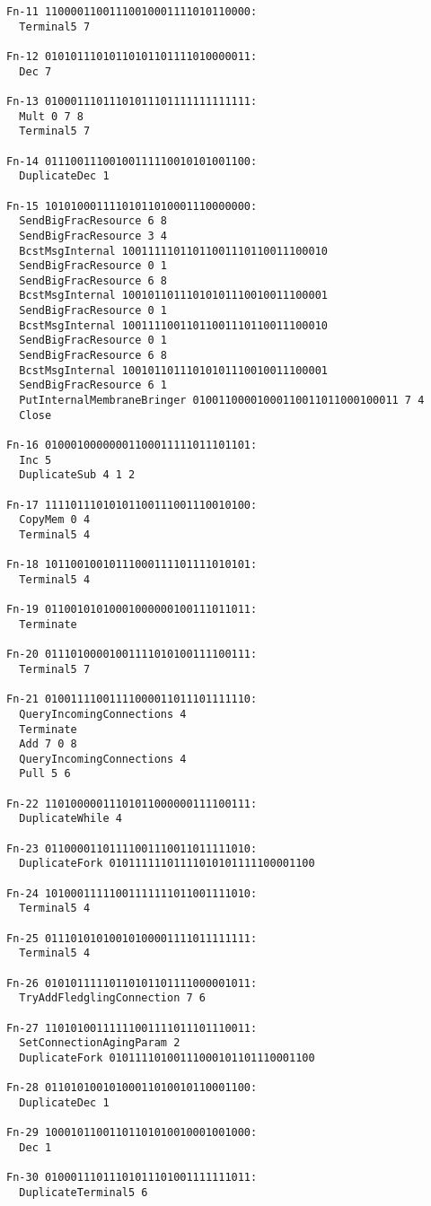 \begin{verbatim}
Fn-11 11000011001110010001111010110000:
  Terminal5 7

Fn-12 01010111010110101101111010000011:
  Dec 7

Fn-13 01000111011101011101111111111111:
  Mult 0 7 8
  Terminal5 7

Fn-14 01110011100100111110010101001100:
  DuplicateDec 1

Fn-15 10101000111101011010001110000000:
  SendBigFracResource 6 8
  SendBigFracResource 3 4
  BcstMsgInternal 10011111011011001110110011100010
  SendBigFracResource 0 1
  SendBigFracResource 6 8
  BcstMsgInternal 10010110111010101110010011100001
  SendBigFracResource 0 1
  BcstMsgInternal 10011110011011001110110011100010
  SendBigFracResource 0 1
  SendBigFracResource 6 8
  BcstMsgInternal 10010110111010101110010011100001
  SendBigFracResource 6 1
  PutInternalMembraneBringer 01001100001000110011011000100011 7 4
  Close

Fn-16 01000100000001100011111011101101:
  Inc 5
  DuplicateSub 4 1 2

Fn-17 11110111010101100111001110010100:
  CopyMem 0 4
  Terminal5 4

Fn-18 10110010010111000111101111010101:
  Terminal5 4

Fn-19 01100101010001000000100111011011:
  Terminate

Fn-20 01110100001001111010100111100111:
  Terminal5 7

Fn-21 01001111001111000011011101111110:
  QueryIncomingConnections 4
  Terminate
  Add 7 0 8
  QueryIncomingConnections 4
  Pull 5 6

Fn-22 11010000011101011000000111100111:
  DuplicateWhile 4

Fn-23 01100001101111001110011011111010:
  DuplicateFork 01011111101111010101111100001100

Fn-24 10100011111001111111011001111010:
  Terminal5 4

Fn-25 01110101010010100001111011111111:
  Terminal5 4

Fn-26 01010111110110101101111000001011:
  TryAddFledglingConnection 7 6

Fn-27 11010100111111001111011101110011:
  SetConnectionAgingParam 2
  DuplicateFork 01011110100111000101101110001100

Fn-28 01101010010100011010010110001100:
  DuplicateDec 1

Fn-29 10001011001101101010010001001000:
  Dec 1

Fn-30 01000111011101011101001111111011:
  DuplicateTerminal5 6
\end{verbatim}
